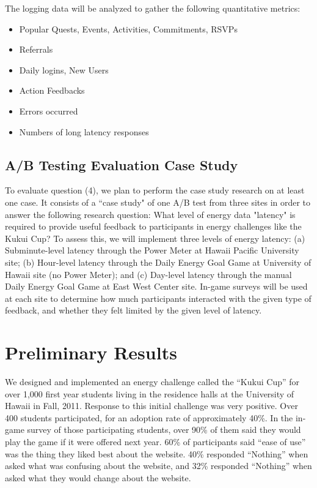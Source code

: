 \documentclass[11pt]{article}
\begin{document}
The logging data will be analyzed to gather the following quantitative metrics:
\begin{itemize}
 \item Popular Quests, Events, Activities, Commitments, RSVPs
 \item Referrals
 \item Daily logins, New Users
 \item Action Feedbacks
 \item Errors occurred
 \item Numbers of long latency responses
\end{itemize}

\subsection{A/B Testing Evaluation Case Study}
To evaluate question (4), we plan to perform the case study research on at least one case. It consists of a ``case study" of one A/B test from three sites in order to answer the following research question: What level of energy data "latency" is required to provide useful feedback to participants in energy challenges like the Kukui Cup?  To assess this, we will implement three levels of energy latency:  (a) Subminute-level latency through the Power Meter at Hawaii Pacific University site; (b) Hour-level latency through the Daily Energy Goal Game at University of Hawaii site (no Power Meter); and (c) Day-level latency through the manual Daily Energy Goal Game at East West Center site.  In-game surveys will  be used at each site to determine how much participants interacted with the given type of feedback, and whether they felt limited by the given level of latency.

\section{Preliminary Results}
We designed and implemented an energy challenge called the ``Ku\-kui Cup'' for over 1,000 first year students living in the residence halls at the University of Hawaii in Fall, 2011. Response to this initial challenge was very positive. Over 400 students participated, for an adoption rate of approximately 40\%.  In the in-game survey of those participating students, over 90\% of them said they would play the game if it were offered next year.  60\% of participants said ``ease of use'' was the thing they liked best about the website.  40\% responded ``Nothing'' when asked what was confusing about the website, and 32\% responded ``Nothing'' when asked what they would change about the website.
\end{document}
